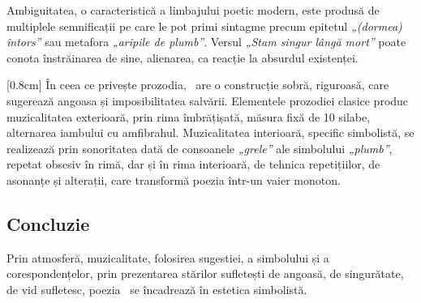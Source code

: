Ambiguitatea, o caracteristică a limbajului poetic modern, este produsă de multiplele semnificații pe care le pot primi sintagme precum epitetul \textit{„(dormea) întors”} sau metafora \textit{„aripile de plumb”}. Versul \textit{„Stam singur lângă mort”} poate conota înstrăinarea de sine, alienarea, ca reacție la absurdul existenței.

[0.8cm]
În ceea ce privește prozodia, \operatitle\ are o construcție sobră, riguroasă, care sugerează angoasa și imposibilitatea salvării. Elementele prozodiei clasice produc muzicalitatea exterioară, prin rima îmbrățișată, măsura fixă de 10 silabe, alternarea iambului cu amfibrahul. Muzicalitatea interioară, specific simbolistă, se realizează prin sonoritatea dată de consoanele \textit{„grele”} ale simbolului \textit{„plumb”}, repetat obsesiv în rimă, dar și în rima interioară, de tehnica repetițiilor, de asonanțe și alterații, care transformă poezia într-un vaier monoton.


\subsection{Concluzie}

Prin atmosferă, muzicalitate, folosirea sugestiei, a simbolului și a corespondențelor, prin prezentarea stărilor sufletești de angoasă, de singurătate, de vid sufletesc, poezia \operatitle\ se încadrează în estetica simbolistă.
